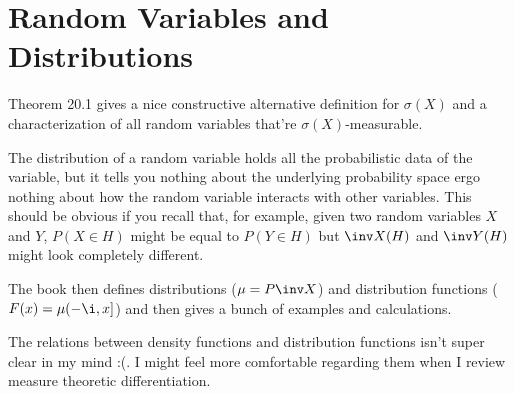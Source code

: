 \documentclass{pset}
\begin{document}
\maketitle
\pagebreak

\section{Random Variables and Distributions}
\begin{list}{}{\leftmargin=1em}
    \item Theorem 20.1 gives a nice constructive alternative definition for $\sigma(X)$ and a characterization of all random variables that're $\sigma(X)$-measurable.
    \item The distribution of a random variable holds all the probabilistic data of the variable, but it tells you nothing about the underlying probability space ergo nothing about how the random variable interacts with other variables. This should be obvious if you recall that, for example, given two random variables $X$ and $Y$, $P(X\in H)$ might be equal to $P(Y\in H)$ but $\inv X(H)$ and $\inv Y(H)$ might look completely different.
    \item The book then defines distributions ($\mu=P\inv X$) and distribution functions ($F(x) = \mu(-\i, x]$) and then gives a bunch of examples and calculations.
    \item The relations between density functions and distribution functions isn't super clear in my mind :(. I might feel more comfortable regarding them when I review measure theoretic differentiation. 
\end{list}
\end{document}
